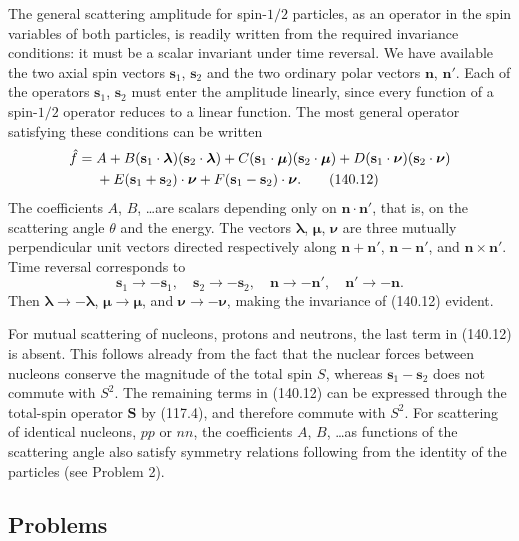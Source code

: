 The general scattering amplitude for spin-$1/2$ particles, as an operator in
the spin variables of both particles, is readily written from the required
invariance conditions: it must be a scalar invariant under time reversal. We
have available the two axial spin vectors $\mathbf s_1$, $\mathbf s_2$ and
the two ordinary polar vectors $\mathbf n$, $\mathbf n'$. Each of the
operators $\mathbf s_1$, $\mathbf s_2$ must enter the amplitude linearly,
since every function of a spin-$1/2$ operator reduces to a linear function.
The most general operator satisfying these conditions can be written
\begin{align}
 \hat f={}&A+B(\mathbf s_1\cdot\boldsymbol\lambda)(\mathbf s_2\cdot\boldsymbol\lambda)
 +C(\mathbf s_1\cdot\boldsymbol\mu)(\mathbf s_2\cdot\boldsymbol\mu)
 +D(\mathbf s_1\cdot\boldsymbol\nu)(\mathbf s_2\cdot\boldsymbol\nu)\notag\\
 &+E(\mathbf s_1+\mathbf s_2)\cdot\boldsymbol\nu
 +F(\mathbf s_1-\mathbf s_2)\cdot\boldsymbol\nu.
 \tag{140.12}
\end{align}
The coefficients $A$, $B$, \ldots are scalars depending only on
$\mathbf n\cdot\mathbf n'$, that is, on the scattering angle $\theta$ and
the energy. The vectors $\boldsymbol\lambda$, $\boldsymbol\mu$,
$\boldsymbol\nu$ are three mutually perpendicular unit vectors directed
respectively along $\mathbf n+\mathbf n'$, $\mathbf n-\mathbf n'$, and
$\mathbf n\times\mathbf n'$. Time reversal corresponds to
\[
 \mathbf s_1\to-\mathbf s_1,\quad\mathbf s_2\to-\mathbf s_2,\quad
 \mathbf n\to-\mathbf n',\quad\mathbf n'\to-\mathbf n.
\]
Then $\boldsymbol\lambda\to-\boldsymbol\lambda$,
$\boldsymbol\mu\to\boldsymbol\mu$, and
$\boldsymbol\nu\to-\boldsymbol\nu$, making the invariance of (140.12)
evident.

For mutual scattering of nucleons, protons and neutrons, the last term in
(140.12) is absent. This follows already from the fact that the nuclear forces
between nucleons conserve the magnitude of the total spin $S$, whereas
$\mathbf s_1-\mathbf s_2$ does not commute with $S^2$. The remaining terms in
(140.12) can be expressed through the total-spin operator $\mathbf S$ by
(117.4), and therefore commute with $S^2$. For scattering of identical
nucleons, $pp$ or $nn$, the coefficients $A$, $B$, \ldots as functions of the
scattering angle also satisfy symmetry relations following from the identity
of the particles (see Problem 2).

\subsection*{Problems}

